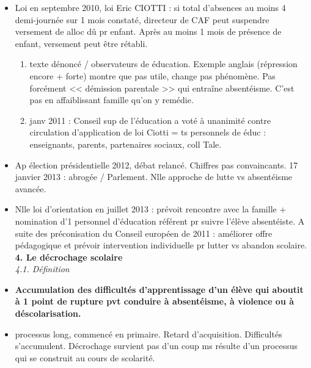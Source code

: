 \documentclass[12pt]{report}
\begin{document}
\begin{itemize}
\item Loi en septembre 2010, loi Eric CIOTTI : si total d'absences au moins 4 demi-journée sur 1 mois constaté, directeur de CAF peut suspendre versement de alloc dû pr enfant. Après au moins 1 mois de présence de enfant, versement peut être rétabli.
\begin{enumerate}
\item texte dénoncé / observateurs de éducation. Exemple anglais (répression encore + forte) montre que pas utile, change pas phénomène. Pas forcément << démission parentale >> qui entraîne absentéisme. C'est pas en affaiblissant famille qu'on y remédie.\\ 
\item janv 2011 : Conseil sup de l'éducation a voté à unanimité contre circulation d'application de loi Ciotti = ts personnels de éduc : enseignants, parents, partenaires sociaux, coll Tale. \\
\end{enumerate}

\item Ap élection présidentielle 2012, débat relancé. Chiffres pas convaincants. 17 janvier 2013 : abrogée / Parlement. Nlle approche de lutte vs absentéisme avancée.

\item Nlle loi d'orientation en juillet 2013 : prévoit rencontre avec la famille + nomination d'1 personnel d'éducation référent pr suivre l'élève absentéiste. A suite des préconisation du Conseil européen de 2011 : améliorer offre pédagogique et prévoir intervention individuelle pr lutter vs abandon scolaire. \\

\textbf{4. Le décrochage scolaire} \\

\textit{4.1. Définition} \\

\item \textbf{Accumulation des difficultés d'apprentissage d'un élève qui aboutit à 1 point de rupture pvt conduire à absentéisme, à violence ou à déscolarisation.} \\

\item processus long, commencé en primaire. Retard d'acquisition. Difficultés s'accumulent. Décrochage survient pas d'un coup ms résulte d'un processus qui se construit au cours de scolarité.\\

\end{itemize}
\end{document}
